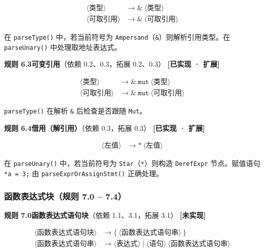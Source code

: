 \documentclass[12pt,a4paper]{ctexart}
\begin{document}
\begin{align}
\langle\text{类型}\rangle &\rightarrow \texttt{\&} \ \langle\text{类型}\rangle \\
\langle\text{可取引用}\rangle &\rightarrow \texttt{\&} \ \langle\text{可取引用}\rangle
\end{align}

在 \texttt{parseType()} 中，若当前符号为 \texttt{Ampersand}（\texttt{\&}）则解析引用类型。在 \texttt{parseUnary()} 中处理取地址表达式。

\textbf{规则 6.3\quad 可变引用}（依赖 0.2、0.3，拓展 0.2、0.3） \hfill \textcolor{green!60!black}{\textbf{[已实现 · 扩展]}}

\begin{align}
\langle\text{类型}\rangle &\rightarrow \texttt{\&} \ \texttt{mut} \ \langle\text{类型}\rangle \\
\langle\text{可取引用}\rangle &\rightarrow \texttt{\&} \ \texttt{mut} \ \langle\text{可取引用}\rangle
\end{align}

\texttt{parseType()} 在解析 \texttt{\&} 后检查是否跟随 \texttt{Mut}。

\textbf{规则 6.4\quad 借用（解引用）}（依赖 0.3，拓展 0.3） \hfill \textcolor{green!60!black}{\textbf{[已实现 · 扩展]}}

\begin{align}
\langle\text{左值}\rangle &\rightarrow \texttt{*} \ \langle\text{左值}\rangle
\end{align}

在 \texttt{parseUnary()} 中，若当前符号为 \texttt{Star}（\texttt{*}）则构造 \texttt{DerefExpr} 节点。赋值语句 \texttt{*a = 3;} 由 \texttt{parseExprOrAssignStmt()} 正确处理。

\subsubsection{函数表达式块（规则 7.0 -- 7.4）}

\textbf{规则 7.0\quad 函数表达式语句块}（依赖 1.1、3.1，拓展 3.1） \hfill \textcolor{red!70!black}{\textbf{[未实现]}}

\begin{align}
\langle\text{函数表达式语句块}\rangle &\rightarrow \texttt{\{} \ \langle\text{函数表达式语句串}\rangle \ \texttt{\}} \\
\langle\text{函数表达式语句串}\rangle &\rightarrow \langle\text{表达式}\rangle \mid \langle\text{语句}\rangle \ \langle\text{函数表达式语句串}\rangle
\end{align}
\end{document}
